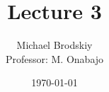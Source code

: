 


\title{Lecture 3}
\date{\today}
\author{Michael Brodskiy\\ \small Professor: M. Onabajo}



\maketitle

